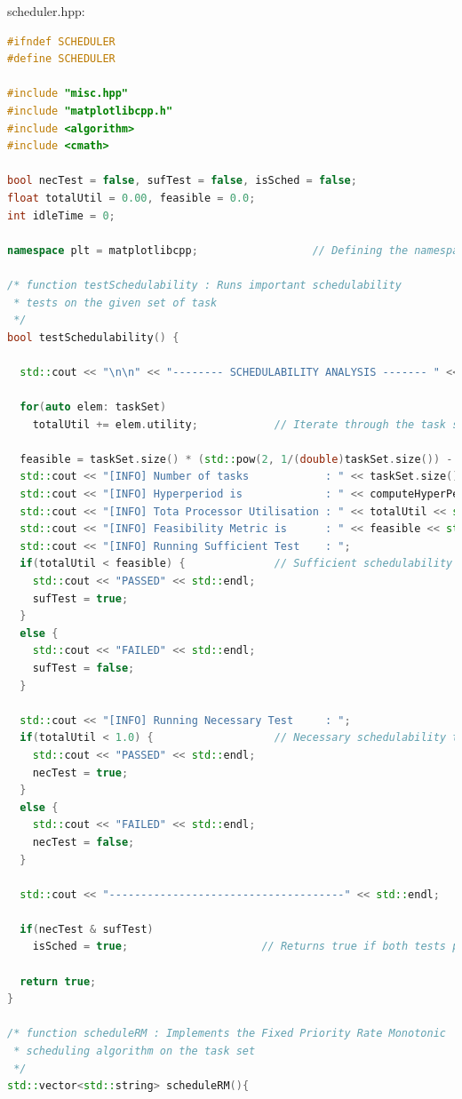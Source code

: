 scheduler.hpp:
\begin{lstlisting}[language=C++, frame=single]
#ifndef SCHEDULER
#define SCHEDULER

#include "misc.hpp"
#include "matplotlibcpp.h"
#include <algorithm>
#include <cmath>

bool necTest = false, sufTest = false, isSched = false;
float totalUtil = 0.00, feasible = 0.0;
int idleTime = 0;

namespace plt = matplotlibcpp;                  // Defining the namespace for matplotlib

/* function testSchedulability : Runs important schedulability
 * tests on the given set of task
 */
bool testSchedulability() {

  std::cout << "\n\n" << "-------- SCHEDULABILITY ANALYSIS ------- " << std::endl;

  for(auto elem: taskSet)
    totalUtil += elem.utility;            // Iterate through the task set and compute the total utilisation

  feasible = taskSet.size() * (std::pow(2, 1/(double)taskSet.size()) - 1);
  std::cout << "[INFO] Number of tasks            : " << taskSet.size() << std::endl;
  std::cout << "[INFO] Hyperperiod is             : " << computeHyperPeriod(taskSet) << " time units" << std::endl;
  std::cout << "[INFO] Tota Processor Utilisation : " << totalUtil << std::endl;
  std::cout << "[INFO] Feasibility Metric is      : " << feasible << std::endl;
  std::cout << "[INFO] Running Sufficient Test    : ";
  if(totalUtil < feasible) {              // Sufficient schedulability test
    std::cout << "PASSED" << std::endl;
    sufTest = true;
  }
  else {
    std::cout << "FAILED" << std::endl;
    sufTest = false;
  }

  std::cout << "[INFO] Running Necessary Test     : ";
  if(totalUtil < 1.0) {                   // Necessary schedulability test
    std::cout << "PASSED" << std::endl;
    necTest = true;
  }
  else {
    std::cout << "FAILED" << std::endl;
    necTest = false;
  }

  std::cout << "-------------------------------------" << std::endl;

  if(necTest & sufTest)
    isSched = true;                     // Returns true if both tests pass

  return true;
}

/* function scheduleRM : Implements the Fixed Priority Rate Monotonic
 * scheduling algorithm on the task set
 */
std::vector<std::string> scheduleRM(){


\end{lstlisting}
